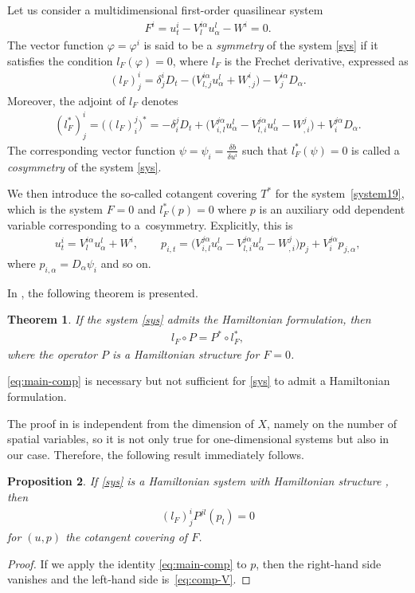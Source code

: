 \documentclass[pdftex]{sigma}
\numberwithin{equation}{section}
\newtheorem{Theorem}{Theorem}[section]
\newtheorem{Proposition}[Theorem]{Proposition}
 { \theoremstyle{definition}
\newtheorem{Definition}[Theorem]{Definition}
\newtheorem{Note}[Theorem]{Note}
\newtheorem{Example}[Theorem]{Example}
\newtheorem{Remark}[Theorem]{Remark} }
\begin{document}
Let us consider a multidimensional first-order quasilinear system
\begin{gather}\label{system19}
F^i=u^i_t-V^{i\alpha}_lu^l_\alpha-W^i=0.
\end{gather}
The vector function $\varphi=\varphi^i$ is said to be a \emph{symmetry} of the system \eqref{sys} if it satisfies the condition $l_F(\varphi)=0$, where $l_F$ is the Frechet derivative, expressed as
\begin{gather*}
(l_F)^i_j=\delta^i_jD_t-\big(V^{i\alpha}_{l,j}u^l_\alpha+W^i_{,j}\big)-V^{i\alpha}_jD_\alpha.
\end{gather*}
Moreover, the adjoint of $l_F$ denotes
\begin{gather*}
(l^*_F)^i_j=\big((l_F)^j_i\big)^*=-\delta^j_iD_t+\big(V^{j\alpha}_{i,l}u^l_\alpha-V^{j\alpha}_{l,i}u^l_\alpha-W^j_{,i}\big)+V^{j\alpha}_iD_\alpha.
\end{gather*}
The corresponding vector function $\psi=\psi_i=\frac{\delta b}{\delta u^i}$ such that $l^*_F(\psi)=0$ is called a \emph{cosymmetry} of the system \eqref{sys}.

We then introduce the so-called cotangent covering $T^*$ for the system~\eqref{system19}, which is the system $F=0$ and $l^*_F(p)=0$ where $p$ is an auxiliary odd dependent variable corresponding to a~cosymmetry. Explicitly, this is
\begin{gather}\label{cov}
u^i_t=V^{i\alpha}_lu^l_\alpha+W^i,\qquad
p_{i,t}=\big(V^{j\alpha}_{i,l}u^l_\alpha-V^{j\alpha}_{l,i}u^l_\alpha-W^j_{,i}\big)p_j+V^{j\alpha}_ip_{j,\alpha},
\end{gather}
where $p_{i,\alpha}=D_\alpha\psi_i$ and so on.

In \cite{kersten2004hamiltonian}, the following theorem is presented.
\begin{Theorem}
If the system \eqref{sys} admits the Hamiltonian formulation, then
\begin{gather}\label{eq:main-comp}
l_F\circ P=P^*\circ l_F^*,
\end{gather}
where the operator $P$ is a Hamiltonian structure for $F=0$.
\end{Theorem}
\begin{Remark}
\eqref{eq:main-comp} is necessary but not sufficient for \eqref{sys} to admit a Hamiltonian formulation.
\end{Remark}
The proof in \cite{kersten2004hamiltonian} is independent from the dimension of $X$, namely on the number of spatial variables, so it is not only true for one-dimensional systems but also in our case. Therefore, the following result immediately follows.
\begin{Proposition}
If \eqref{sys} is a Hamiltonian system with Hamiltonian structure , then
\begin{gather}\label{eq:comp-V}
(l_F)^i_jP^{jl}(p_l)=0
\end{gather}
for $(u,p)$ the cotangent covering of $F$.
\end{Proposition}
\begin{proof}
If we apply the identity \eqref{eq:main-comp} to $p$, then the right-hand side vanishes and the left-hand side is~\eqref{eq:comp-V}.
\end{proof}
\end{document}
